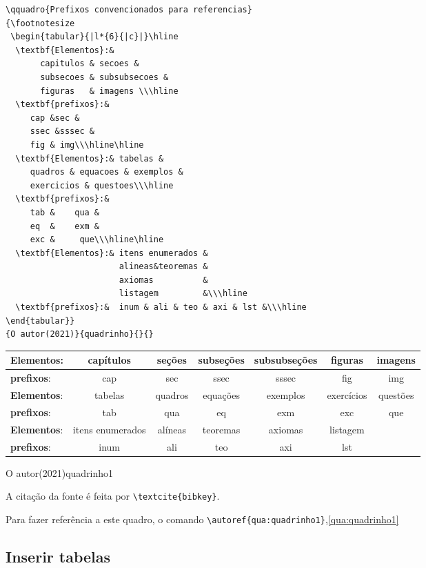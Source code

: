 \begin{lstlisting}
\qquadro{Prefixos convencionados para referencias}
{\footnotesize
 \begin{tabular}{|l*{6}{|c}|}\hline
  \textbf{Elementos}:& 
       capitulos & secoes & 
       subsecoes & subsubsecoes &
       figuras   & imagens \\\hline
  \textbf{prefixos}:&
     cap &sec &
     ssec &sssec &
     fig & img\\\hline\hline
  \textbf{Elementos}:& tabelas &
     quadros & equacoes & exemplos &
     exercicios & questoes\\\hline	
  \textbf{prefixos}:&
     tab &    qua & 
     eq  &    exm & 
     exc &     que\\\hline\hline
  \textbf{Elementos}:& itens enumerados &
                       alineas&teoremas &
                       axiomas          & 
                       listagem         &\\\hline
  \textbf{prefixos}:&  inum & ali & teo & axi & lst &\\\hline
\end{tabular}}
{O autor(2021)}{quadrinho}{}{}
\end{lstlisting}

{\footnotesize
 \begin{tabular}{|l*{6}{|c}|}\hline
  \textbf{Elementos}:& capítulos& 	seções&	subseções&	subsubseções&	
  figuras&	imagens \\\hline
  \textbf{prefixos}:&cap&sec&ssec&sssec&fig & img\\\hline\hline
  \textbf{Elementos}:&tabelas&	quadros&	
  equações& exemplos& exercícios & questões\\\hline	
  \textbf{prefixos}:&tab&qua&eq& exm & exc&que\\\hline\hline
  \textbf{Elementos}:&itens enumerados& alíneas&teoremas&	axiomas & listagem &\\\hline
  \textbf{prefixos}:&inum &ali&teo& axi &lst&\\\hline
\end{tabular}}
{O autor(2021)}{quadrinho1}{}{}


A citação da fonte é feita por \verb+\textcite{bibkey}+.

Para fazer referência a este quadro, o comando \verb+\autoref{qua:quadrinho1}+,\autoref{qua:quadrinho1}


\subsection[Tabelas]{Inserir tabelas}

